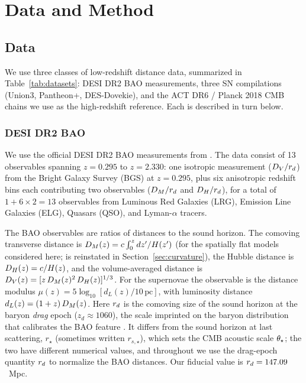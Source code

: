 
\section{Data and Method}
\label{sec:data_method}

\subsection{Data}
\label{sec:data}

We use three classes of low-redshift distance data, summarized in Table~\ref{tab:datasets}: DESI DR2 BAO measurements, three SN compilations (Union3, Pantheon+, DES-Dovekie), and the ACT DR6 / Planck 2018 CMB chains we use as the high-redshift reference. Each is described in turn below.

\subsubsection{DESI DR2 BAO}

We use the official DESI DR2 BAO measurements from \citet{DESI_DR2_BAO}. The data consist of 13 observables spanning $z = 0.295$ to $z = 2.330$: one isotropic measurement ($D_V/r_d$) from the Bright Galaxy Survey (BGS) at $z = 0.295$, plus six anisotropic redshift bins each contributing two observables ($D_M/r_d$ and $D_H/r_d$), for a total of $1 + 6 \times 2 = 13$ observables from Luminous Red Galaxies (LRG), Emission Line Galaxies (ELG), Quasars (QSO), and Lyman-$\alpha$ tracers.

The BAO observables are ratios of distances to the sound horizon. The comoving transverse distance is $D_M(z) = c\int_0^z dz'/H(z')$ (for the spatially flat models considered here; \Omk{} is reinstated in Section~\ref{sec:curvature}), the Hubble distance is $D_H(z) = c/H(z)$, and the volume-averaged distance is $D_V(z) = [z\,D_M(z)^2\,D_H(z)]^{1/3}$. For the supernovae the observable is the distance modulus $\mu(z) = 5\log_{10}[d_L(z)/10\,\mathrm{pc}]$, with luminosity distance $d_L(z) = (1+z)\,D_M(z)$. Here $r_d$ is the comoving size of the sound horizon at the baryon \emph{drag} epoch ($z_d \approx 1060$), the scale imprinted on the baryon distribution that calibrates the BAO feature \citep{DESI_DR2_BAO,ACT_DR6_extended}. It differs from the sound horizon at last scattering, $r_\star$ (sometimes written $r_{s,\star}$), which sets the CMB acoustic scale $\theta_\star$; the two have different numerical values, and throughout we use the drag-epoch quantity $r_d$ to normalize the BAO distances. Our fiducial value is $r_d = 147.09$~Mpc.

